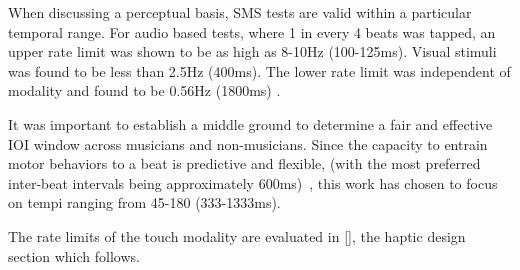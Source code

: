 When discussing a perceptual basis, SMS tests are valid within a particular temporal range. For audio based tests, where 1 in every 4 beats was tapped, an upper rate limit was shown to be as high as 8-10Hz (100-125ms). Visual stimuli was found to be less than 2.5Hz (400ms). The lower rate limit was independent of modality and found to be 0.56Hz (1800ms) \cite{repp2006rate}. 

It was important to establish a middle ground to determine a fair and effective IOI window across musicians and non-musicians. Since the capacity to entrain motor behaviors to a beat is predictive and flexible, (with the most preferred inter-beat intervals being approximately 600ms)~\cite{repp2013sensorimotor}, this work has chosen to focus on tempi ranging from 45-180 (333-1333ms).

The rate limits of the touch modality are evaluated in \ref{}, the haptic design section which follows.
